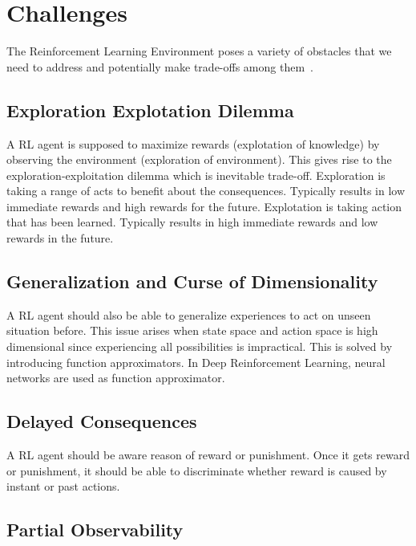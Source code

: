 \section{Challenges}
\label{sec:chal}

The Reinforcement Learning Environment poses a variety of obstacles 
that we need to address and potentially make trade-offs among them~\cite{dulac-arnold_challenges_2019, sutton_reinforcement_1998}.

\subsection{Exploration Explotation Dilemma}

A RL agent is supposed to maximize rewards (explotation of knowledge) by observing the environment (exploration of environment). 
This gives rise to the exploration-exploitation dilemma which is inevitable trade-off. 
Exploration is taking a range of acts to benefit about the consequences. 
Typically results in low immediate rewards and high rewards for the future. 
Explotation is taking action that has been learned. Typically results in high immediate rewards and low rewards in the future. 

\subsection{Generalization and Curse of Dimensionality}

A RL agent should also be able to generalize experiences to act on unseen situation before. 
This issue arises when state space and action space is high dimensional since experiencing all possibilities is impractical. 
This is solved by introducing function approximators. In Deep Reinforcement Learning, neural networks are used as function approximator. 

\subsection{Delayed Consequences}

A RL agent should be aware reason of reward or punishment. 
Once it gets reward or punishment, it should be able to discriminate whether reward is caused by instant or past actions. 

\subsection{Partial Observability}

